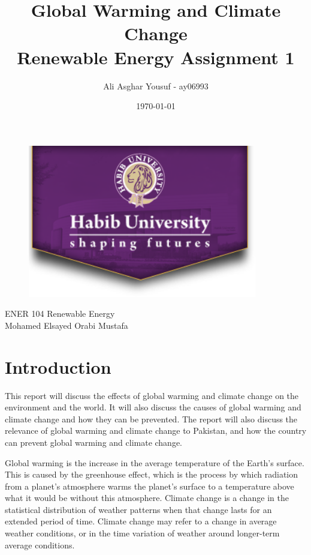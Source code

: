 \documentclass{article}
\title{\huge{\textbf{Global Warming and Climate Change}}\\
    \LARGE{Renewable Energy Assignment 1}}
\author{Ali Asghar Yousuf - ay06993}
\date{\today}
\begin{document}
\clearpage\maketitle
\thispagestyle{empty}
\begin{center}
    \begin{figure}[h]
        \centering
        \includegraphics[width=10cm]{hu_logo.png}
        \label{fig:logo}
    \end{figure}
    \large{ENER 104 Renewable Energy \\
        Mohamed Elsayed Orabi Mustafa}
\end{center}
\newpage
\setcounter{page}{1}
\tableofcontents

\newpage
{} %

\section{Introduction}
This report will discuss the effects of global warming and climate change on
the environment and the world. It will also discuss the causes of global
warming and climate change and how they can be prevented. The report will also
discuss the relevance of global warming and climate change to Pakistan, and how
the country can prevent global warming and climate change.

Global warming is the increase in the average temperature of the Earth's
surface. This is caused by the greenhouse effect, which is the process by which
radiation from a planet's atmosphere warms the planet's surface to a
temperature above what it would be without this atmosphere. Climate change is a
change in the statistical distribution of weather patterns when that change
lasts for an extended period of time. Climate change may refer to a change in
average weather conditions, or in the time variation of weather around
longer-term average conditions.
\end{document}
